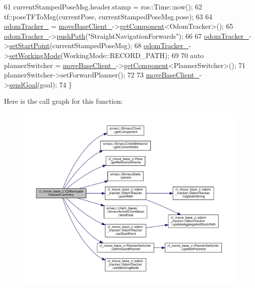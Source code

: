 \begin{DoxyCode}
61   currentStampedPoseMsg.header.stamp = ros::Time::now();
62   tf::poseTFToMsg(currentPose, currentStampedPoseMsg.pose);
63 
64   \hyperlink{classcl__move__base__z_1_1CbNavigateForward_a7583a4d669af48618bd45950db8e5292}{odomTracker\_} = \hyperlink{classcl__move__base__z_1_1CbMoveBaseClientBehaviorBase_ab2ef219464cfac8659b4a87c8d0db6d5}{moveBaseClient\_}->\hyperlink{classsmacc_1_1ISmaccClient_adef78db601749ca63c19e74a27cb88cc}{getComponent}<OdomTracker>();
65   \hyperlink{classcl__move__base__z_1_1CbNavigateForward_a7583a4d669af48618bd45950db8e5292}{odomTracker\_}->\hyperlink{classcl__move__base__z_1_1odom__tracker_1_1OdomTracker_ab92735db58cfdf8d0055e3f01be124d3}{pushPath}(\textcolor{stringliteral}{"StraightNavigationForwards"});
66 
67   \hyperlink{classcl__move__base__z_1_1CbNavigateForward_a7583a4d669af48618bd45950db8e5292}{odomTracker\_}->\hyperlink{classcl__move__base__z_1_1odom__tracker_1_1OdomTracker_a9f4989c6353022c2ec3b0546c09bf3bc}{setStartPoint}(currentStampedPoseMsg);
68   \hyperlink{classcl__move__base__z_1_1CbNavigateForward_a7583a4d669af48618bd45950db8e5292}{odomTracker\_}->\hyperlink{classcl__move__base__z_1_1odom__tracker_1_1OdomTracker_aeed01bdefd9a1cc709b0b3e4eed285ed}{setWorkingMode}(WorkingMode::RECORD\_PATH);
69 
70   \textcolor{keyword}{auto} plannerSwitcher = \hyperlink{classcl__move__base__z_1_1CbMoveBaseClientBehaviorBase_ab2ef219464cfac8659b4a87c8d0db6d5}{moveBaseClient\_}->\hyperlink{classsmacc_1_1ISmaccClient_adef78db601749ca63c19e74a27cb88cc}{getComponent}<PlannerSwitcher>();
71   plannerSwitcher->setForwardPlanner();
72 
73   \hyperlink{classcl__move__base__z_1_1CbMoveBaseClientBehaviorBase_ab2ef219464cfac8659b4a87c8d0db6d5}{moveBaseClient\_}->\hyperlink{classsmacc_1_1client__bases_1_1SmaccActionClientBase_a9c47a5094ac8afb01680307fe5eca922}{sendGoal}(goal);
74 \}
\end{DoxyCode}
Here is the call graph for this function\+:
\nopagebreak
\begin{figure}[H]
\begin{center}
\leavevmode
\includegraphics[width=350pt]{classcl__move__base__z_1_1CbNavigateForward_af9a2e49071de287922c3f5963a079b95_cgraph}
\end{center}
\end{figure}
